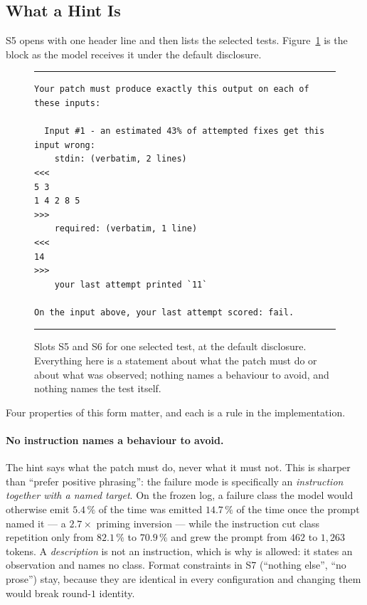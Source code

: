 \subsection{What a Hint Is}

S5 opens with one header line and then lists the selected tests.
Figure~\ref{fig:contract} is the block as the model receives it under the
default disclosure.

\begin{figure}[htbp]
\centering
\begin{minipage}{0.93\textwidth}
\footnotesize
\hrule\vspace{5pt}
\begin{verbatim}
Your patch must produce exactly this output on each of these inputs:

  Input #1 - an estimated 43% of attempted fixes get this input wrong:
    stdin: (verbatim, 2 lines)
<<<
5 3
1 4 2 8 5
>>>
    required: (verbatim, 1 line)
<<<
14
>>>
    your last attempt printed `11`

On the input above, your last attempt scored: fail.
\end{verbatim}
\vspace{-8pt}\hrule
\end{minipage}
\caption[The contract block, as the model receives it]{Slots S5 and S6 for one
selected test, at the default disclosure. Everything here is a statement about
what the patch must do or about what was observed; nothing names a behaviour
to avoid, and nothing names the test itself.}
\label{fig:contract}
\end{figure}

Four properties of this form matter, and each is a rule in the implementation.

\paragraph{No instruction names a behaviour to avoid.} The hint says what the
patch must do, never what it must not. This is sharper than ``prefer positive
phrasing'': the failure mode is specifically an \emph{instruction together
with a named target}. On the frozen log, a failure class the model would
otherwise emit $5.4\,\%$ of the time was emitted $14.7\,\%$ of the time once
the prompt named it --- a $2.7\times$ priming inversion --- while the
instruction cut class repetition only from $82.1\,\%$ to $70.9\,\%$ and grew
the prompt from $462$ to $1{,}263$ tokens. A \emph{description} is not an
instruction, which is why  is
allowed: it states an observation and names no class. Format constraints in S7
(``nothing else'', ``no prose'') stay, because they are identical in every
configuration and changing them would break round-$1$ identity.

